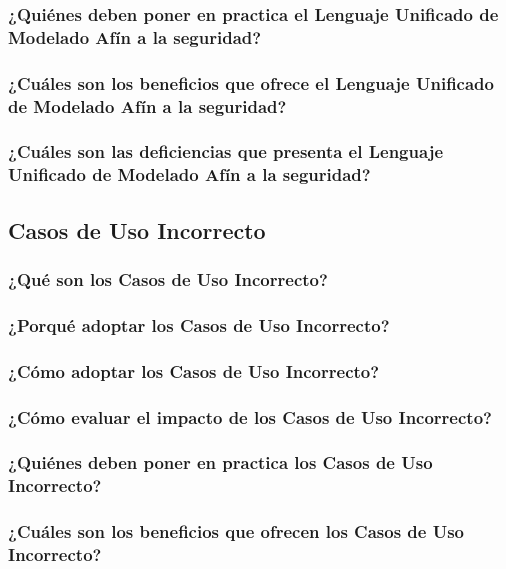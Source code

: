 \documentclass[runningheads,a4paper]{llncs}
\begin{document}
\subsubsection{¿Quiénes deben poner en practica el Lenguaje Unificado de Modelado Afín a la seguridad?}

\subsubsection{¿Cuáles son los beneficios que ofrece el Lenguaje Unificado de Modelado Afín a la seguridad?}

\subsubsection{¿Cuáles son las deficiencias que presenta el Lenguaje Unificado de Modelado Afín a la seguridad?}


\subsection{Casos de Uso Incorrecto}

\subsubsection{¿Qué son los Casos de Uso Incorrecto?}

\subsubsection{¿Porqué adoptar los Casos de Uso Incorrecto?}

\subsubsection{¿Cómo adoptar los Casos de Uso Incorrecto?}

\subsubsection{¿Cómo evaluar el impacto de los Casos de Uso Incorrecto?}

\subsubsection{¿Quiénes deben poner en practica los Casos de Uso Incorrecto?}

\subsubsection{¿Cuáles son los beneficios que ofrecen los Casos de Uso Incorrecto?}
\end{document}

